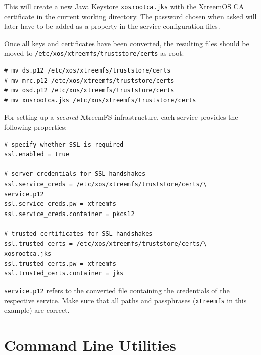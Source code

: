 \documentclass[a4paper,10pt]{book}
\begin{document}
This will create a new Java Keystore \texttt{xosrootca.jks} with the XtreemOS CA certificate in the current working directory. The password chosen when asked will later have to be added as a property in the service configuration files.

Once all keys and certificates have been converted, the resulting files should be moved to \texttt{/etc/xos/xtreemfs/truststore/certs} as root:


\begin{verbatim}
# mv ds.p12 /etc/xos/xtreemfs/truststore/certs
# mv mrc.p12 /etc/xos/xtreemfs/truststore/certs
# mv osd.p12 /etc/xos/xtreemfs/truststore/certs
# mv xosrootca.jks /etc/xos/xtreemfs/truststore/certs
\end{verbatim}


For setting up a \textit{secured} XtreemFS infrastructure, each service provides the following properties:


\begin{verbatim}
# specify whether SSL is required
ssl.enabled = true

# server credentials for SSL handshakes
ssl.service_creds = /etc/xos/xtreemfs/truststore/certs/\
service.p12
ssl.service_creds.pw = xtreemfs
ssl.service_creds.container = pkcs12

# trusted certificates for SSL handshakes
ssl.trusted_certs = /etc/xos/xtreemfs/truststore/certs/\
xosrootca.jks
ssl.trusted_certs.pw = xtreemfs
ssl.trusted_certs.container = jks
\end{verbatim}

\texttt{service.p12} refers to the converted file containing the credentials of the respective service. Make sure that all paths and passphrases (\texttt{xtreemfs} in this example) are correct.



\chapter{Command Line Utilities}
\end{document}
